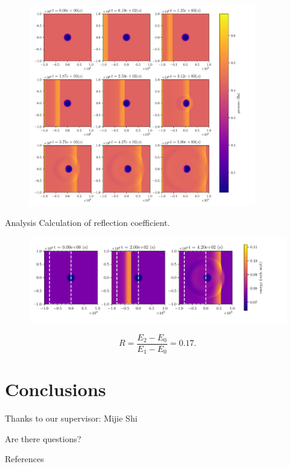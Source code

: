 \documentclass{beamer}
\begin{document}
\begin{frame}
	\begin{figure}[h]
		\centering
		\includegraphics[width=0.88\textwidth]{../report/figures/hole_time.pdf}
	\end{figure}
\end{frame}
\begin{frame}{Analysis}
	Calculation of reflection coefficient.
	\begin{figure}[h]
		\centering
		\includegraphics[width=1.1\textwidth]{figures/reflection_coefficient.pdf}
	\end{figure}	
	\[
	R = \frac{E_2 - E_0}{E_1 - E_0} = 0.17
	.\] 
\end{frame}
\section{Conclusions}
\begin{frame}
Thanks to our supervisor: Mijie Shi

\bigskip

Are there questions?
\end{frame}
\begin{frame}{References}
    \printbibliography
\end{frame}
\end{document}
